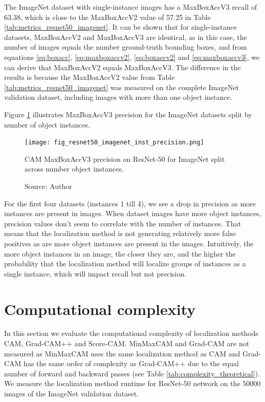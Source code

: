 The ImageNet dataset with single-instance images has a MaxBoxAccV3 recall of 63.38, which is close to the MaxBoxAccV2 value of 57.25 in Table \ref{tab:metrics_resnet50_imagenet}. It can be shown that for single-instance datasets, MaxBoxAccV2 and MaxBoxAccV3 are identical, as in this case, the number of images equals the number ground-truth bounding boxes, and from equations \ref{eq:boxacc}, \ref{eq:maxboxaccv2}, \ref{eq:boxaccv2} and \ref{eq:maxboxaccv3}, we can derive that MaxBoxAccV2 equals MaxBoxAccV3. The difference in the results is because the MaxBoxAccV2 value from Table \ref{tab:metrics_resnet50_imagenet} was measured on the complete ImageNet validation dataset, including images with more than one object instance.

Figure \ref{fig:resnet50_imagenet_inst_precision} illustrates MaxBoxAccV3 precision for the ImageNet datasets split by number of object instances.

\begin{figure}[h]
    \begin{center}       
    \texttt{[image: fig\_resnet50\_imagenet\_inst\_precision.png]}
    \caption[CAM MaxBoxAccV3 precision on ResNet-50 for ImageNet split across number object instances]{CAM MaxBoxAccV3 precision on ResNet-50 for ImageNet split across number object instances.}
    \caption*{Source: Author}
    \label{fig:resnet50_imagenet_inst_precision}
    \end{center}
\end{figure}

For  the first four datasets (instances 1 till 4), we see a drop in precision as more instances are present in images. When dataset images have more object instances, precision values don't seem to correlate with the number of instances. That means that the localization method is not generating relatively more false positives as are more object instances are present in the images. Intuitively, the more object instances in an image, the closer they are, and the higher the probability that the localization method will localize groups of instances as a single instance, which will impact recall but not precision. 
 
\section{Computational complexity}
In this section we evaluate the computational complexity of localization methods CAM, Grad-CAM++ and Score-CAM. MinMaxCAM and Grad-CAM are not measured as MinMaxCAM uses the same localization method as CAM and Grad-CAM has the same order of complexity as Grad-CAM++ due to the equal number of forward and backward passes (see Table \ref{tab:complexity_theoretical}). We measure the localization method runtime for ResNet-50 network on the 50000 images of the ImageNet validation dataset. 

